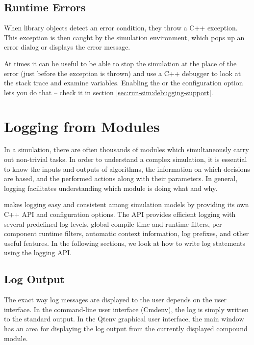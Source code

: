 \subsection{Runtime Errors}
\label{sec:sim-lib:runtime-errors}

When library objects detect an error condition, they throw a C++ exception.
This exception is then caught by the simulation environment, which pops up
an error dialog or displays the error message.

At times it can be useful to be able to stop the simulation at the place of
the error (just before the exception is thrown) and use a C++ debugger to
look at the stack trace and examine variables. Enabling the
 or the 
configuration option lets you do that -- check it in section
\ref{sec:run-sim:debugging-support}.


\section{Logging from Modules}
\label{sec:sim-lib:logging-from-modules}

In a simulation, there are often thousands of modules which simultaneously carry
out non-trivial tasks. In order to understand a complex simulation, it is
essential to know the inputs and outputs of algorithms, the information on
which decisions are based, and the performed actions along with their parameters.
In general, logging facilitates understanding which module is doing what and why.

{\opp} makes logging easy and consistent among simulation models by providing
its own C++ API and configuration options. The API provides efficient logging
with several predefined log levels, global compile-time and runtime filters,
per-component runtime filters, automatic context information, log prefixes, and
other useful features. In the following sections, we look at how to write log
statements using the {\opp} logging API.

\subsection{Log Output}
\label{sec:sim-lib:log-output}

The exact way log messages are displayed to the user depends on the user interface.
In the command-line user interface (Cmdenv), the log is simply
written to the standard output. In the Qtenv graphical user interface,
the main window has an area for displaying the log output from the currently
displayed compound module.

